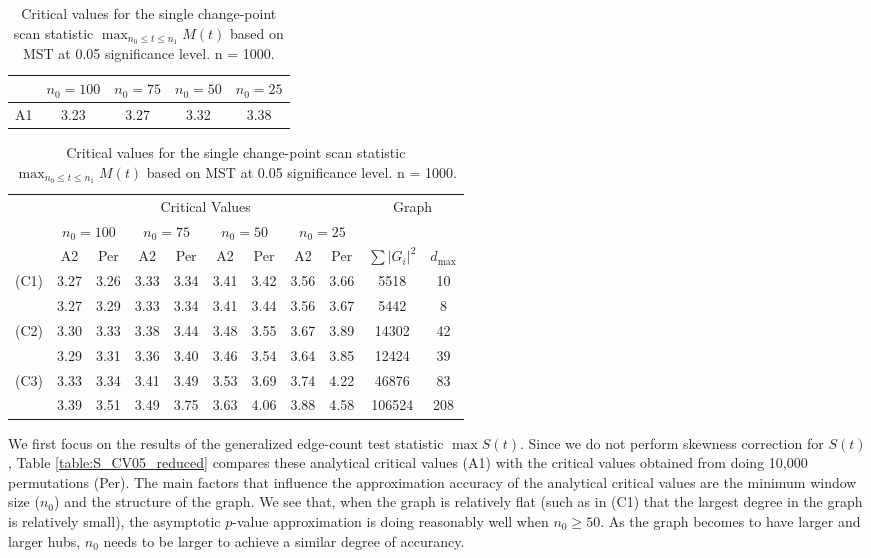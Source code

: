 \documentclass[arxiv, preprint]{imsart}
\numberwithin{equation}{section}
\theoremstyle{plain}
\begin{document}
\begin{table}[h]
\centering 
 \caption{Critical values for the single change-point scan statistic $\max_{n_0 \le t \le n_1} M(t)$ based on MST at 0.05 significance level. n = 1000.}
  \label{table:M_CV05_reduced}
\begin{tabular}{|c|c|c|c|c|}
\hline  
\hline
& $n_0 = 100$ & $n_0 = 75$ & $n_0 = 50$ & $n_0 = 25$\\
\hline
A1  & 3.23 & 3.27 &  3.32 & 3.38  \\
\hline 
\end{tabular} 

\vspace{2mm}

\begin{tabular}{p{0.7cm}|cc|cc|cc|cc|cc} 
\hline  
\hline
& \multicolumn{8}{c}{Critical Values} & \multicolumn{2}{|c}{Graph} \\
\cline{2-11}
& \multicolumn{2}{|c|}{$n_0 = 100$} &  \multicolumn{2}{|c|}{$n_0 = 75$} &  \multicolumn{2}{|c|}{$n_0 = 50$} &  \multicolumn{2}{|c|}{$n_0 = 25$} \\
\cline{2-9}
& A2 & Per &  A2 &Per & A2 &Per &  A2 &Per &  $\sum|G_i|^2$ & $d_{\max}$ \\
\hline 
\hline
\multirow{2}{0.7cm}{(C1)}
& 3.27 & 3.26 & 3.33 & 3.34 & 3.41 & 3.42 & 3.56 & 3.66 & 5518 & 10\\
& 3.27 & 3.29 & 3.33 & 3.34 & 3.41 & 3.44 & 3.56 & 3.67 & 5442 &  8\\
\hline
\multirow{2}{0.7cm}{(C2)}
& 3.30 & 3.33 & 3.38 & 3.44 & 3.48 & 3.55 & 3.67 & 3.89 & 14302 & 42 \\
& 3.29 & 3.31 & 3.36 & 3.40 & 3.46 & 3.54 & 3.64 & 3.85 & 12424 & 39 \\
\hline
\multirow{2}{0.7cm}{(C3)}
& 3.33 & 3.34 & 3.41 & 3.49 & 3.53 & 3.69 & 3.74 & 4.22 &  46876 &  83 \\
& 3.39 & 3.51 & 3.49 & 3.75 & 3.63 & 4.06 & 3.88 & 4.58 & 106524 & 208 \\
\hline
\hline

\end{tabular} 
\end{table} 


We first focus on the results of the generalized edge-count test statistic $\max S(t)$. Since we do not perform skewness correction for $S(t)$, Table \ref{table:S_CV05_reduced} compares these analytical critical values (A1) with the critical values obtained from doing 10,000 permutations (Per). The main factors that influence the approximation accuracy of the analytical critical values are the minimum window size ($n_0$) and the structure of the graph. %
We see that, when the graph is relatively flat (such as in (C1) that the largest degree in the graph is relatively small), the asymptotic $p$-value approximation is doing reasonably well when $n_0\geq 50$.  As the graph becomes to have larger and larger hubs, $n_0$ needs to be larger to achieve a similar degree of accurancy. 
\end{document}
